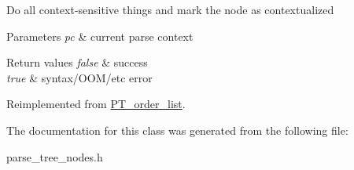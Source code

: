 Do all context-\/sensitive things and mark the node as contextualized


\begin{DoxyParams}{Parameters}
{\em pc} & current parse context\\
\hline
\end{DoxyParams}

\begin{DoxyRetVals}{Return values}
{\em false} & success \\
\hline
{\em true} & syntax/\+O\+O\+M/etc error \\
\hline
\end{DoxyRetVals}


Reimplemented from \mbox{\hyperlink{classPT__order__list_a04039b92b0e1bd5d37f1975459e7b9b6}{P\+T\+\_\+order\+\_\+list}}.



The documentation for this class was generated from the following file\+:\begin{DoxyCompactItemize}
\item 
parse\+\_\+tree\+\_\+nodes.\+h\end{DoxyCompactItemize}
